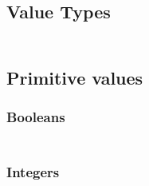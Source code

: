 \subsection{Value Types}\hypertarget{value-types}{}\label{value-types}

\begin{align*}
  [ \
  \KEY{Type} \quad & \NAMEHYPER{../../../../../Funcons-beta/Values}{Value-Types}{values} \\
  \KEY{Alias} \quad & \NAMEHYPER{../../../../../Funcons-beta/Values}{Value-Types}{vals} \\
  \KEY{Funcon} \quad & \NAMEHYPER{../../../../../Funcons-beta/Values}{Value-Types}{is-equal} \\
  \KEY{Alias} \quad & \NAMEHYPER{../../../../../Funcons-beta/Values}{Value-Types}{is-eq}
  \ ]
\end{align*}
\subsection{Primitive values}\hypertarget{primitive-values}{}\label{primitive-values}

\subsubsection{Booleans}\hypertarget{booleans}{}\label{booleans}

\begin{align*}
  [ \
  \KEY{Funcon} \quad & \NAMEHYPER{../../../../../Funcons-beta/Values/Primitive}{Booleans}{true} \\
  \KEY{Funcon} \quad & \NAMEHYPER{../../../../../Funcons-beta/Values/Primitive}{Booleans}{false} \\
  \KEY{Funcon} \quad & \NAMEHYPER{../../../../../Funcons-beta/Values/Primitive}{Booleans}{not}
  \ ]
\end{align*}
\subsubsection{Integers}\hypertarget{integers}{}\label{integers}


